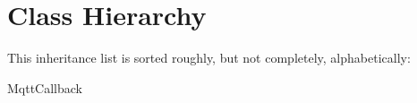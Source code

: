 \section{Class Hierarchy}
This inheritance list is sorted roughly, but not completely, alphabetically\+:\begin{DoxyCompactList}
\item {}
\item {}
\item {}
\item Mqtt\+Callback\begin{DoxyCompactList}
\item {}
\end{DoxyCompactList}
\end{DoxyCompactList}
